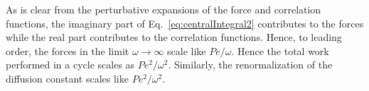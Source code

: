 \documentclass[amsmath,preprintnumbers,10pt,article,notitlepage]{revtex4-1}
\begin{document}
As is clear from the perturbative expansions of the force and correlation functions, the imaginary part of Eq.~\ref{eq:centralIntegral2} contributes to the forces while the real part contributes to the correlation functions. Hence, to leading order, the forces in the limit $\omega \rightarrow \infty$ scale like $Pe/\omega$. Hence the total work performed in a cycle scales as $Pe^2/\omega^2$. Similarly, the renormalization of the diffusion constant scales like $Pe^2/\omega^2$. 









\end{document}
